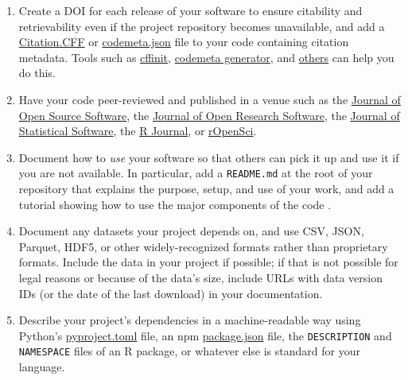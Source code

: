 \documentclass[10pt,letterpaper]{article}
\begin{document}
\begin{enumerate}

\item
  Create a DOI for each release of your software
  to ensure citability and retrievability even if the project repository becomes unavailable,
  and add a \href{https://citation-file-format.github.io/}{Citation.CFF}
  or \href{https://codemeta.github.io}{codemeta.json} file to your code \cite{Druskat2021}
  containing citation metadata.
  Tools such as \href{https://citation-file-format.github.io/cff-initializer-javascript/}{cffinit},
  \href{https://codemeta.github.io/codemeta-generator/}{codemeta generator},
  and \href{https://github.com/citation-file-format/citation-file-format/blob/main/README.md\#tools-to-work-with-citationcff-files-wrench}{others}
  can help you do this.

\item
  Have your code peer-reviewed and published in a venue such as
  the \href{https://joss.theoj.org/}{Journal of Open Source Software},
  the \href{https://openresearchsoftware.metajnl.com/}{Journal of Open Research Software},
  the \href{http://www.jstatsoft.org}{Journal of Statistical Software},
  the \href{https://journal.r-project.org/}{R Journal},
  or \href{https://ropensci.org/}{rOpenSci}.

\item
  Document how to \emph{use} your software so that others can pick it up and use it if you are not available.
  In particular,
  add a \texttt{README.md} at the root of your repository
  that explains the purpose, setup, and use of your work,
  and add a tutorial showing how to use the major components of the code
  \cite{Lee2018b,Huybrechts2024,Littauer2025,Katz2025,Turing2025}.

\item
  Document any datasets your project depends on,
  and use CSV, JSON, Parquet, HDF5, or other widely-recognized formats rather than proprietary formats.
  Include the data in your project if possible;
  if that is not possible for legal reasons or because of the data's size,
  include URLs with data version IDs (or the date of the last download) in your documentation.

\item
  Describe your project's dependencies in a machine-readable way
  using Python's \href{https://packaging.python.org/en/latest/guides/writing-pyproject-toml/}{pyproject.toml} file,
  an npm \href{https://docs.npmjs.com/cli/v10/configuring-npm/package-json?v=true}{package.json} file,
  the \texttt{DESCRIPTION} and \texttt{NAMESPACE} files of an R package,
  or whatever else is standard for your language.


\end{enumerate}
\end{document}
